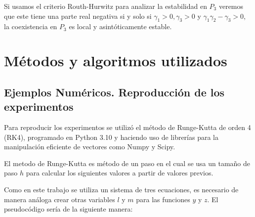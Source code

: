 \documentclass{wscpaperproc}
\theoremstyle{wsc}
\begin{document}
Si usamos el criterio Routh-Hurwitz para analizar la estabilidad en $P_3$ veremos que este
tiene una parte real negativa si y solo si $\gamma_1>0, \gamma_3>0$ y $\gamma_1\gamma_2-\gamma_3>0$, la coexistencia en $P_3$ es local
y asintóticamente estable.

\vspace*{3cm}


\section*{Métodos y algoritmos utilizados}


\subsection*{Ejemplos Numéricos. Reproducción de los experimentos}

Para reproducir los experimentos se utilizó el método de Runge-Kutta de orden 4 (RK4), programado
en Python 3.10 y haciendo uso de librerías para la manipulación eficiente de vectores como Numpy y
Scipy.

El metodo de Runge-Kutta es método de un paso en el cual se usa un tamaño de paso $h$ para calcular
los siguientes valores a partir de valores previos.

Como en este trabajo se utiliza un sistema de tres ecuaciones,
es necesario de manera análoga crear otras variables $l$ y $m$ para
las funciones $y$ y $z$. El pseudocódigo sería de la siguiente manera:
\end{document}
